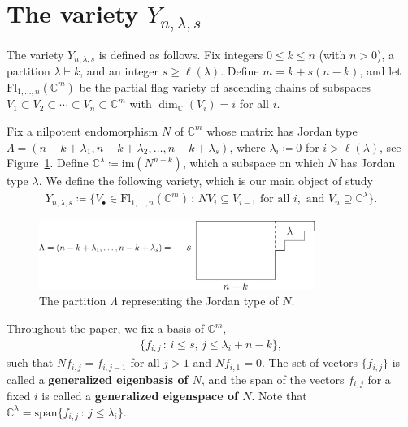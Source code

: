 \documentclass[submission]{FPSAC2021}
\theoremstyle{plain}
\numberwithin{equation}{section}
\newcommand{\bC}{\mathbb{C}}
\newcommand{\st}{\,:\,}
\newcommand{\vspan}{\mathrm{span}}
\newcommand{\Fl}{\mathrm{Fl}}
\newcommand{\la}{\lambda}
\newcommand{\im}{\mathrm{im}}
\begin{document}
\section{The variety $Y_{n,\lambda,s}$}\label{sec:YVarieties}

The variety $Y_{n,\lambda,s}$ is defined as follows. Fix integers $0\leq k\leq n$ (with $n>0$), a partition $\lambda\vdash k$, and an integer $s\geq \ell(\lambda)$. Define $m = k + s(n-k)$, and let $\Fl_{1,\dots, n}(\bC^m)$ be the partial flag variety of ascending chains of subspaces $V_1\subset V_2\subset \cdots \subset V_n\subset \bC^m$ with $\dim_\bC(V_i) = i$ for all $i$. 

Fix a nilpotent endomorphism $N$ of $\bC^m$ whose matrix has Jordan type $\Lambda = (n-k+\la_1,n-k+\la_2,\dots, n-k+\la_s)$, where $\la_i \coloneqq 0$ for $i>\ell(\la)$, see Figure~\ref{fig:Lambda}. Define $\bC^\lambda \coloneqq \im(N^{n-k})$, which a subspace on which $N$ has Jordan type $\lambda$. We define the following variety, which is our main object of study
\begin{align}
Y_{n,\la,s} \coloneqq \{V_\bullet \in \Fl_{1,\dots, n}(\bC^m) \st N V_i\subseteq V_{i-1}\text{ for all }i,\text{ and } V_n\supseteq \bC^\lambda\}.
\end{align}
\begin{figure}
    \centering
    \includegraphics[width=0.8\textwidth]{LambdaEx.eps}
    \caption{The partition $\Lambda$ representing the Jordan type of $N$.
    }
    \label{fig:Lambda}
\end{figure}


Throughout the paper, we fix a basis of $\bC^m$,
\begin{align}
\{f_{i,j} \st i\leq s,\, j\leq \la_i+n-k\},
\end{align}
 such that $Nf_{i,j} = f_{i,j-1}$ for all $j>1$ and $Nf_{i,1} = 0$. The set of vectors $\{f_{i,j}\}$ is called a \textbf{generalized eigenbasis of $N$}, and the span of the vectors $f_{i,j}$ for a fixed $i$ is called a \textbf{generalized eigenspace of $N$}. Note that $\bC^\lambda = \vspan\{ f_{i,j} \st j \leq \la_i \}$.
 
\end{document}
